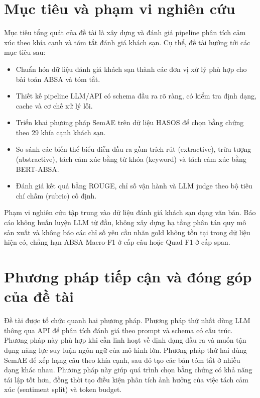 \documentclass[12pt,a4paper]{report}
\begin{document}
\section{Mục tiêu và phạm vi nghiên cứu}

Mục tiêu tổng quát của đề tài là xây dựng và đánh giá pipeline phân tích cảm xúc theo khía cạnh và tóm tắt đánh giá khách sạn. Cụ thể, đề tài hướng tới các mục tiêu sau:

\begin{itemize}[leftmargin=1.2cm]
    \item Chuẩn hóa dữ liệu đánh giá khách sạn thành các đơn vị xử lý phù hợp cho bài toán ABSA và tóm tắt.
    \item Thiết kế pipeline LLM/API có schema đầu ra rõ ràng, có kiểm tra định dạng, cache và cơ chế xử lý lỗi.
    \item Triển khai phương pháp SemAE trên dữ liệu HASOS để chọn bằng chứng theo 29 khía cạnh khách sạn.
    \item So sánh các biến thể biểu diễn đầu ra gồm trích rút (extractive), trừu tượng (abstractive), tách cảm xúc bằng từ khóa (keyword) và tách cảm xúc bằng BERT-ABSA.
    \item Đánh giá kết quả bằng ROUGE, chỉ số vận hành và LLM judge theo bộ tiêu chí chấm (rubric) cố định.
\end{itemize}

Phạm vi nghiên cứu tập trung vào dữ liệu đánh giá khách sạn dạng văn bản. Báo cáo không huấn luyện LLM từ đầu, không xây dựng hạ tầng phân tán quy mô sản xuất và không báo các chỉ số yêu cầu nhãn gold không tồn tại trong dữ liệu hiện có, chẳng hạn ABSA Macro-F1 ở cấp câu hoặc Quad F1 ở cấp span.

\section{Phương pháp tiếp cận và đóng góp của đề tài}

Đề tài được tổ chức quanh hai phương pháp. Phương pháp thứ nhất dùng LLM thông qua API để phân tích đánh giá theo prompt và schema có cấu trúc. Phương pháp này phù hợp khi cần linh hoạt về định dạng đầu ra và muốn tận dụng năng lực suy luận ngôn ngữ của mô hình lớn. Phương pháp thứ hai dùng SemAE để xếp hạng câu theo khía cạnh, sau đó tạo các bản tóm tắt ở nhiều dạng khác nhau. Phương pháp này giúp quá trình chọn bằng chứng có khả năng tái lập tốt hơn, đồng thời tạo điều kiện phân tích ảnh hưởng của việc tách cảm xúc (sentiment split) và token budget.
\end{document}
